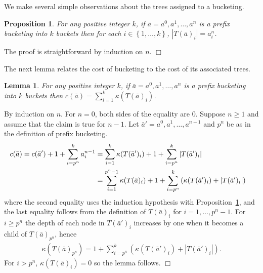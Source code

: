 \documentclass[11pt]{article}
\newtheorem{lemma}[theorem]{Lemma}
\newtheorem{proposition}[theorem]{Proposition}
\newcommand{\qed}{$\Box$}
\newenvironment{proof}{\noindent {\bf Proof:}}{\hfill \qed \smallskip}
\newcommand{\natInt}[2]{ \left\{ #1, \dotsc, #2 \right\} }
\begin{document}
We make several simple observations about the trees assigned to a bucketing.

\begin{proposition}\label{p-ts}
For any positive integer $k$, if $\bar{a} = a^0,a^1,\dotsc,a^n$ is a prefix bucketing into $k$ buckets
then for each $i \in \natInt{1}{k}$, $|T(\bar{a})_i| = a^n_i$.
\end{proposition}
\begin{proof}
The proof is straightforward by induction on $n$.
\end{proof}

The next lemma relates the cost of bucketing to the cost of its associated trees.
\begin{lemma}\label{l-tc}
For any positive integer $k$, if $\bar{a} = a^0,a^1,\dotsc,a^n$ is a prefix bucketing into $k$ buckets then
 $c(\bar{a})=\sum_{i=1}^k \kappa(T(\bar{a})_i)$.
\end{lemma}

\iffalse
\begin{proof}
By induction it suffices to show that
$\kappa(T(\bar{a}))-\kappa(T(\bar{a}'))=c(\bar{a})-c(\bar{a}')$, where $\kappa(T(\bar{a})) = \sum_{i=1}^k \kappa(T(\bar{a})_i)$. By definition of $c(\cdot)$ and Proposition \ref{p-ts},
$c(\bar{a})-c(\bar{a}')=a^n_{p^n}=|T(\bar{a})_{p^n}|$.
So it suffices to show $\kappa(T(\bar{a}))-\kappa(T(\bar{a}'))=|T(\bar{a})_{p^n}|$.
By the definition of $\kappa(\cdot)$ and the inductive definition of 
$T(\bar{a})$, 
$$\kappa(T(\bar{a}))-\kappa(T(\bar{a}'))= \kappa(T(\bar{a}_{p^n}))-\sum_{i \geq p^n} \kappa(T(\bar{a}'_{i})).$$ 
This equals $|T(\bar{a})|_{p^n}$, as required, since each node
of $\bigcup_{i \geq p^n} T(\bar{a}')_i$ corresponds (bijectively) to a 
non-root of  $T(\bar{a})_{p^n}$ of depth one greater.
\end{proof}
\fi

\begin{proof}
By induction on $n$. For $n=0$, both sides of the equality are 0.  Suppose $n \geq 1$
and assume that the claim is true for $n-1$.  Let $\bar{a}'=a^0,a^1,\dotsc,a^{n-1}$ and $p^n$ be as in the definition of prefix bucketing.
\begin{align*}
c(\bar{a}) = c(\bar{a}') + 1 + \sum_{i=p^n}^k a^{n-1}_i
&= \sum_{i=1}^k \kappa(T(\bar{a}')_i) + 1 + \sum_{i=p^n}^k |T(\bar{a}')_i| \cr
&= \sum_{i=1}^{p^n-1} \kappa(T(\bar{a})_i) + 1 + \sum_{i=p^n}^k \left(\kappa(T(\bar{a}')_i) + |T(\bar{a}')_i|\right)
\end{align*}
where the second equality uses the induction hypothesis with Proposition~\ref{p-ts},
and the last equality follows from the definition of $T(\bar{a})_i$ for $i=1,\dotsc,p^n-1$.
For $i\ge p^n$ the depth of each node in $T(\bar{a}')_i$ increases by one when it becomes a child of $T(\bar{a})_{p^n}$, hence
\begin{align*}
\kappa(T(\bar{a})_{p^n}) =  1 + \sum_{i=p^n}^k \left(\kappa(T(\bar{a}')_i) + |T(\bar{a}')_i|\right).
\end{align*}
For $i > p^n$, $\kappa(T(\bar{a})_i) = 0$ so the lemma follows.
\end{proof}
\end{document}
